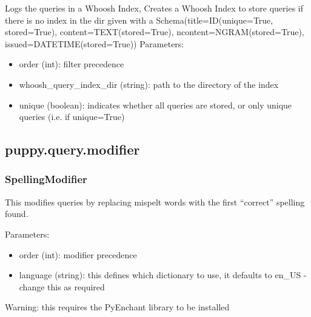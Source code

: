 \documentclass[letterpaper,10pt,english]{sphinxmanual}
\begin{document}
\begin{fulllineitems}
\label{api3.0:puppy.query.filter.whooshQueryLogger.WhooshQueryLogger}
Logs the queries in a Whoosh Index, 
Creates a Whoosh Index to store queries if there is no index in the dir given
with a Schema(title=ID(unique=True, stored=True), content=TEXT(stored=True), ncontent=NGRAM(stored=True), issued=DATETIME(stored=True))
Parameters:
\begin{itemize}
\item {} 
order (int): filter precedence

\item {} 
whoosh\_query\_index\_dir (string): path to the directory of the index

\item {} 
unique (boolean): indicates whether all queries are stored, or only unique queries (i.e. if unique=True)

\end{itemize}

\end{fulllineitems}



\subsection{puppy.query.modifier}
\label{api3.0:puppy-query-modifier}\label{api3.0:module-puppy.query.modifier}

\subsubsection{SpellingModifier}
\label{api3.0:spellingmodifier}\label{api3.0:puppy-spelling-mod}

\begin{fulllineitems}
\label{api3.0:puppy.query.modifier.SpellingCorrectingModifier}
This modifies queries by replacing mispelt words with the first ``correct'' spelling found.

Parameters:
\begin{itemize}
\item {} 
order (int): modifier precedence

\item {} 
language (string): this defines which dictionary to use, it defaults to en\_US - change this as required

\end{itemize}

Warning: this requires the PyEnchant library to be installed

\end{fulllineitems}
\end{document}
